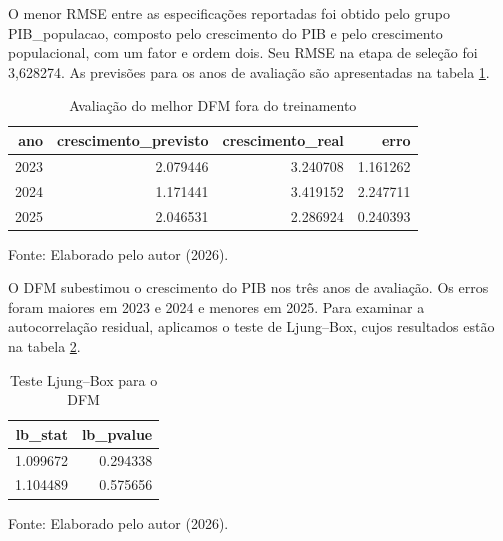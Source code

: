 O menor RMSE entre as especificações reportadas foi obtido pelo grupo PIB\_populacao, composto pelo crescimento do PIB e pelo crescimento populacional, com um fator e ordem dois. Seu RMSE na etapa de seleção foi 3,628274. As previsões para os anos de avaliação são apresentadas na tabela \ref{tab:previsao_melhor_dfm}.

\begin{table}[htbp]
	\centering
	\captionsetup{justification=centering}
	\caption{Avaliação do melhor DFM fora do treinamento}
	\label{tab:previsao_melhor_dfm}
	
	\scriptsize
	\setlength{\tabcolsep}{2pt}
	\renewcommand{\arraystretch}{1.3}
	
	\begin{tabular}{rrrr}
		\toprule
		ano & crescimento\_previsto & crescimento\_real & erro \\
		\midrule
		2023 & 2.079446 & 3.240708 & 1.161262 \\
		2024 & 1.171441 & 3.419152 & 2.247711 \\
		2025 & 2.046531 & 2.286924 & 0.240393 \\
		\bottomrule
	\end{tabular}
	
	
	\vspace{0.1cm}
	
	\small Fonte: Elaborado pelo autor (2026).
\end{table}


O DFM subestimou o crescimento do PIB nos três anos de avaliação. Os erros foram maiores em 2023 e 2024 e menores em 2025. Para examinar a autocorrelação residual, aplicamos o teste de Ljung–Box, cujos resultados estão na tabela \ref{tab:autocorrelacao_dfm}.

\begin{table}[htbp]
	\centering
	\captionsetup{justification=centering}
	\caption{Teste Ljung–Box para o DFM}
	\label{tab:autocorrelacao_dfm}
	
	\scriptsize
	\setlength{\tabcolsep}{2pt}
	\renewcommand{\arraystretch}{1.3}
	
	\begin{tabular}{rr}
		\toprule
		lb\_stat & lb\_pvalue \\
		\midrule
		1.099672 & 0.294338 \\
		1.104489 & 0.575656 \\
		\bottomrule
	\end{tabular}
	
	
	\vspace{0.1cm}
	
	\small Fonte: Elaborado pelo autor (2026).
\end{table}


